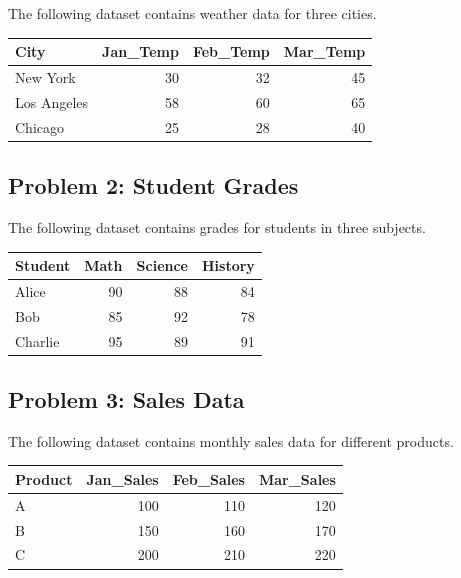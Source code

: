 \documentclass[
  letterpaper,
  DIV=11,
  numbers=noendperiod]{scrreprt}
\begin{document}
The following dataset contains weather data for three cities.

\begin{tabular}{l|r|r|r}
\hline
City & Jan\_Temp & Feb\_Temp & Mar\_Temp\\
\hline
New York & 30 & 32 & 45\\
\hline
Los Angeles & 58 & 60 & 65\\
\hline
Chicago & 25 & 28 & 40\\
\hline
\end{tabular}

\subsection*{Problem 2: Student Grades}\label{problem-2-student-grades}

The following dataset contains grades for students in three subjects.

\begin{table}
\centering
\begin{tabular}{l|r|r|r}
\hline
Student & Math & Science & History\\
\hline
Alice & 90 & 88 & 84\\
\hline
Bob & 85 & 92 & 78\\
\hline
Charlie & 95 & 89 & 91\\
\hline
\end{tabular}
\end{table}

\subsection*{Problem 3: Sales Data}\label{problem-3-sales-data}

The following dataset contains monthly sales data for different
products.

\begin{table}
\centering
\begin{tabular}{l|r|r|r}
\hline
Product & Jan\_Sales & Feb\_Sales & Mar\_Sales\\
\hline
A & 100 & 110 & 120\\
\hline
B & 150 & 160 & 170\\
\hline
C & 200 & 210 & 220\\
\hline
\end{tabular}
\end{table}
\end{document}
